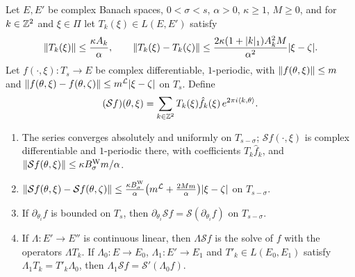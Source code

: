\begin{lemma}\label{bpW:w4:solve}
Let $E,E'$ be complex Banach spaces, $0<\sigma<s$, $\alpha>0$, $\kappa\ge1$, $M\ge0$, and for $k\in\mathbb{Z}^2$ and
$\xi\in\Pi$ let $T_k(\xi)\in L(E,E')$ satisfy
\[\lVert T_k(\xi)\rVert\le\frac{\kappa A_k}\alpha,\qquad\lVert T_k(\xi)-T_k(\zeta)\rVert\le\frac{2\kappa(1+\lvert k\rvert_1)A_k^2M}{\alpha^2}\lvert \xi-\zeta\rvert.\]
Let $f(\cdot,\xi):T_s\to E$ be complex differentiable, $1$-periodic, with $\lVert f(\theta,\xi)\rVert\le m$ and
$\lVert f(\theta,\xi)-f(\theta,\zeta)\rVert\le m^{\mathcal L}\lvert \xi-\zeta\rvert$ on $T_s$. Define
\[(\mathcal Sf)(\theta,\xi)=\sum_{k\in\mathbb{Z}^2}T_k(\xi)\hat f_k(\xi)\,e^{2\pi i\langle k,\theta\rangle}.\]
\begin{enumerate}[label=(\roman*)]
\item The series converges absolutely and uniformly on $T_{s-\sigma}$; $\mathcal Sf(\cdot,\xi)$ is complex
  differentiable and $1$-periodic there, with coefficients $T_k\hat f_k$, and
  $\lVert \mathcal Sf(\theta,\xi)\rVert\le\kappa B^{\rm W}_\sigma m/\alpha$.
\item $\lVert \mathcal Sf(\theta,\xi)-\mathcal Sf(\theta,\zeta)\rVert\le\frac{\kappa B^{\rm W}_\sigma}{\alpha}\bigl(m^{\mathcal L}+\frac{2Mm}{\alpha}\bigr)\lvert \xi-\zeta\rvert$ on $T_{s-\sigma}$.
\item If $\partial_{\theta_i}f$ is bounded on $T_s$, then $\partial_{\theta_i}\mathcal Sf=\mathcal S(\partial_{\theta_i}f)$
  on $T_{s-\sigma}$.
\item If $\Lambda:E'\to E''$ is continuous linear, then $\Lambda\mathcal Sf$ is the solve of $f$ with the operators
  $\Lambda T_k$. If $\Lambda_0:E\to E_0$, $\Lambda_1:E'\to E_1$ and $T'_k\in L(E_0,E_1)$ satisfy
  $\Lambda_1T_k=T'_k\Lambda_0$, then $\Lambda_1\mathcal Sf=\mathcal S'(\Lambda_0f)$.
\end{enumerate}
\end{lemma}

